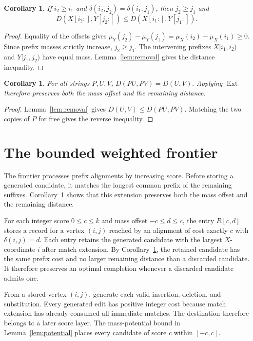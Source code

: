\documentclass[11pt]{article}
\newtheorem{corollary}[theorem]{Corollary}
\theoremstyle{remark}
\newcommand{\Ext}{\operatorname{Ext}}
\begin{document}
\begin{corollary}\label{cor:dominance}
If $i_2\ge i_1$ and $\delta(i_2,j_2)=\delta(i_1,j_1)$, then
$j_2\ge j_1$ and
\[
 D(X[i_2:],Y[j_2:])\le D(X[i_1:],Y[j_1:]).
\]
\end{corollary}
\begin{proof}
Equality of the offsets gives
$\mu_Y(j_2)-\mu_Y(j_1)=\mu_X(i_2)-\mu_X(i_1)\ge0$.
Since prefix masses strictly increase, $j_2\ge j_1$.
The intervening prefixes $X[i_1,i_2)$ and $Y[j_1,j_2)$ have equal
mass. Lemma~\ref{lem:removal} gives the distance inequality.
\end{proof}

\begin{corollary}\label{cor:cancellation}\label{lem:extension}
For all strings $P,U,V$, $D(PU,PV)=D(U,V)$.
Applying $\Ext$ therefore preserves both the mass offset and the
remaining distance.
\end{corollary}
\begin{proof}
Lemma~\ref{lem:removal} gives $D(U,V)\le D(PU,PV)$.
Matching the two copies of $P$ for free gives the reverse inequality.
\end{proof}

\section{The bounded weighted frontier}\label{sec:integer}\label{sec:frontier}

The frontier processes prefix alignments by increasing score.
Before storing a generated candidate, it matches the longest common
prefix of the remaining suffixes.
Corollary~\ref{cor:cancellation} shows that this extension preserves
both the mass offset and the remaining distance.

For each integer score $0\le c\le k$ and mass offset $-c\le d\le c$,
the entry $R[c,d]$ stores a record for a vertex $(i,j)$ reached by an
alignment of cost exactly $c$ with $\delta(i,j)=d$.
Each entry retains the generated candidate with the largest
$X$-coordinate $i$ after match extension.
By Corollary~\ref{cor:dominance}, the retained candidate has the same
prefix cost and no larger remaining distance than a discarded candidate.
It therefore preserves an optimal completion whenever a discarded
candidate admits one.

From a stored vertex $(i,j)$, generate each valid insertion, deletion,
and substitution. Every generated edit has positive integer cost
because match extension has already consumed all immediate matches.
The destination therefore belongs to a later score layer. The
mass-potential bound in Lemma~\ref{lem:potential} places every
candidate of score $c$ within $[-c,c]$.
\end{document}
